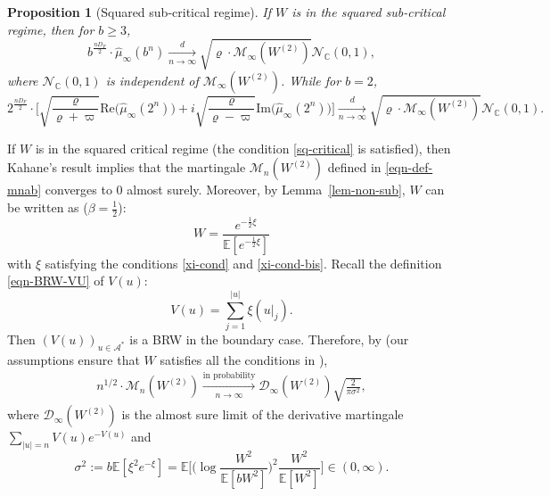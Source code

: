 \documentclass[12pt]{amsart}
\newtheorem{proposition}[theorem]{Proposition}
\theoremstyle{definition}
\theoremstyle{remark}
\newcommand{\C}{\mathbb{C}}
\newcommand{\E}{\mathbb{E}}
\newcommand{\MAB}{\mathscr{M}_{n}(W^{(2)})}
\numberwithin{equation}{section}
\begin{document}
\begin{proposition}[Squared sub-critical regime]\label{thm-sq-sub-critical}
If  $W$  is in the squared sub-critical regime, 
then for $b \ge 3$, 
$$
b^{\frac{nD_F}{2}}  \cdot \widehat{\mu}_{\infty}(b^n)\xrightarrow[n\to\infty]{d} \sqrt{\varrho\cdot \mathscr{M}_\infty(W^{(2)})}\mathcal{N}_{\C}(0,1),
$$
where $\mathcal{N}_{\C}(0,1)$ is independent of $\mathscr{M}_\infty(W^{(2)})$. While for $b = 2$, 
\[
2^{\frac{nD_F}{2}}  \cdot  \Big[   \sqrt{ \frac{\varrho}{\varrho+\varpi}} \mathrm{Re} \big(\widehat{\mu}_{\infty}(2^n)\big) + i  \sqrt{ \frac{\varrho}{\varrho-\varpi}} \mathrm{Im} \big(\widehat{\mu}_{\infty}(2^n)\big) \Big]   \xrightarrow[n\to\infty]{d} \sqrt{\varrho\cdot \mathscr{M}_\infty(W^{(2)})}\mathcal{N}_{\C}(0,1).
\]
\end{proposition}







If  $W$  is in the squared critical regime (the  condition \eqref{sq-critical} is satisfied), then  Kahane's result \cite[Theorem 2]{Kahane-Peyriere-advance} implies that the martingale $\MAB $ defined in \eqref{eqn-def-mnab}
converges to $0$ almost surely. Moreover,  by Lemma~\ref{lem-non-sub}, $W$ can be written as ($\beta =\frac12 $): 
\[
W= \frac{e^{-\frac{1}{2}\xi}}{\E[e^{-\frac{1}{2}\xi}]} 
\]
with $\xi$ satisfying the conditions \eqref{xi-cond} and \eqref{xi-cond-bis}.  Recall the definition 
 \eqref{eqn-BRW-VU} of $V(u)$:
 \[
  V(u) = \sum_{j=1}^{|u|}  \xi(u|_j). 
 \] Then $(V(u))_{u\in\mathcal{A}^*}$ is a BRW in the boundary case. Therefore, by  \cite[Theorem 1.1]{Aideon-Shi} (our assumptions  ensure that $W$ satisfies all the conditions in \cite{Aideon-Shi}),  
\begin{align}\label{root-n-M}
n^{1/2} \cdot \MAB\xrightarrow[n\rightarrow\infty]{\text{in probability}} \mathscr{D}_\infty(W^{(2)})\sqrt{\frac{2}{\pi \sigma^2}},
\end{align}
where $\mathscr{D}_\infty(W^{(2)})$ is the almost sure limit of the derivative martingale $\sum_{|u|=n}V(u)e^{-V(u)}$ and 
\begin{equation}\label{def-BRW-var}
\sigma^2 :=b\E[\xi^2 e^{-\xi }] =\E\Big[ \Big(\log \frac{W^2 }{ \E[ b W^{2}]} \Big)^2 \frac{W^2}{\E[W^2]}\Big ] \in (0,\infty).
\end{equation}
\end{document}
